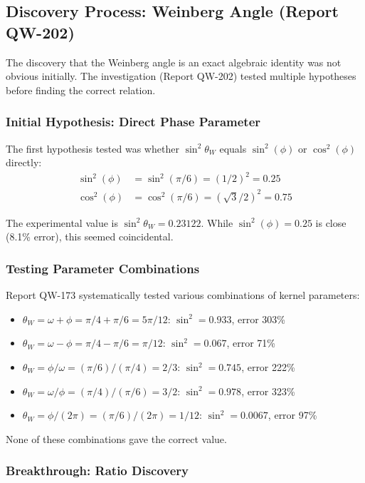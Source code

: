 \documentclass[11pt, a4paper]{article}
\begin{document}
\subsection{Discovery Process: Weinberg Angle (Report QW-202)}

The discovery that the Weinberg angle is an exact algebraic identity was not obvious initially. The investigation (Report QW-202) tested multiple hypotheses before finding the correct relation.

\subsubsection{Initial Hypothesis: Direct Phase Parameter}

The first hypothesis tested was whether $\sin^2 \theta_W$ equals $\sin^2(\phi)$ or $\cos^2(\phi)$ directly:
\begin{align}
\sin^2(\phi) &= \sin^2(\pi/6) = (1/2)^2 = 0.25\\
\cos^2(\phi) &= \cos^2(\pi/6) = (\sqrt{3}/2)^2 = 0.75
\end{align}

The experimental value is $\sin^2 \theta_W = 0.23122$. While $\sin^2(\phi) = 0.25$ is close (8.1\% error), this seemed coincidental.

\subsubsection{Testing Parameter Combinations}

Report QW-173 systematically tested various combinations of kernel parameters:
\begin{itemize}
    \item $\theta_W = \omega + \phi = \pi/4 + \pi/6 = 5\pi/12$: $\sin^2 = 0.933$, error 303\%
    \item $\theta_W = \omega - \phi = \pi/4 - \pi/6 = \pi/12$: $\sin^2 = 0.067$, error 71\%
    \item $\theta_W = \phi/\omega = (\pi/6)/(\pi/4) = 2/3$: $\sin^2 = 0.745$, error 222\%
    \item $\theta_W = \omega/\phi = (\pi/4)/(\pi/6) = 3/2$: $\sin^2 = 0.978$, error 323\%
    \item $\theta_W = \phi/(2\pi) = (\pi/6)/(2\pi) = 1/12$: $\sin^2 = 0.0067$, error 97\%
\end{itemize}

None of these combinations gave the correct value.

\subsubsection{Breakthrough: Ratio Discovery}
\end{document}
